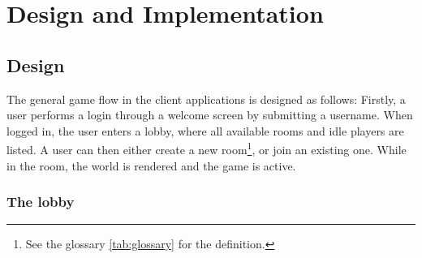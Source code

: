 \chapter{Design and Implementation}


% 
% 
% 
% 
% 
% 
% 



\section{Design}

The general game flow in the client applications is designed as follows: Firstly, a user performs a login through a welcome screen by submitting a username. When logged in, the user enters a lobby, where all available rooms and idle players are listed. A user can then either create a new room\footnote{See the glossary \ref{tab:glossary} for the definition.}, or join an existing one. While in the room, the world is rendered and the game is active.


\subsection{The lobby}


